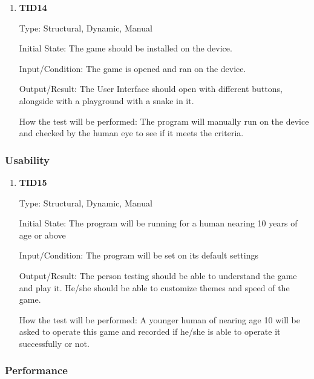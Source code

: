\documentclass[12pt, titlepage]{article}
\begin{document}
\begin{enumerate}
	
	\item{\textbf{TID14}\\}
	
	Type: Structural, Dynamic, Manual
	
	Initial State: The game should be installed on the device.
	
	Input/Condition: The game is opened and ran on the device.
	
	Output/Result: The User Interface should open with different buttons, alongside with a playground with a snake in it.
	
	How the test will be performed: The program will manually run on the device and checked by the human eye to see if it meets the criteria. 
	
	
\end{enumerate}

\subsubsection{Usability}

\begin{enumerate}
	
	\item{\textbf{TID15}\\}
	
	Type: Structural, Dynamic, Manual
	
	Initial State: The program will be running for a human nearing 10 years of age or above
	
	Input/Condition: The program will be set on its default settings
	
	Output/Result: The person testing should be able to understand the game and play it. He/she should be able to customize themes and speed of the game.
	
	How the test will be performed: A younger human of nearing age 10 will be asked to operate this game and recorded if he/she is able to operate it successfully or not. 
	
	
\end{enumerate}

\subsubsection{Performance}
\end{document}
